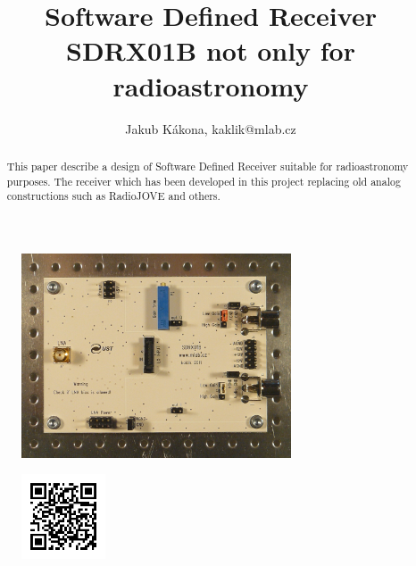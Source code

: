 \documentclass[12pt,a4paper,oneside]{article}
\begin{document}
\title{Software Defined Receiver SDRX01B not only for radioastronomy}
\author{Jakub Kákona, kaklik@mlab.cz }
\maketitle

\begin{abstract}
This paper describe a design of Software Defined Receiver suitable for radioastronomy purposes. The receiver which has been developed in this project replacing old analog constructions such as RadioJOVE and others.
\end{abstract}

\begin{figure} [htbp]
\begin{center}
\includegraphics [width=80mm] {./img/SDRX01B_Top_Big.JPG} 
\end{center}
\end{figure}

\begin{figure} [b]
\includegraphics [width=25mm] {./img/SDRX01B_QRcode.png} 
\end{figure}

\newpage
\tableofcontents
\end{document}
